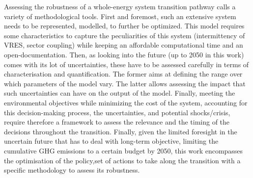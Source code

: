 
%
%
%

Assessing the robustness of a whole-energy system transition pathway calls a variety of methodological tools. First and foremost, such an extensive system needs to be represented, \ie modelled, to further be optimized. This model requires some characteristics to capture the peculiarities of this system (\eg intermittency of \gls{VRES}, sector coupling) while keeping an affordable computational time and an open-documentation.  Then, as looking into the future (\ie up to 2050 in this work) comes with its lot of uncertainties, these have to be assessed carefully in terms of characterisation and quantification. The former aims at defining the range over which parameters of the model vary. The latter allows assessing the impact that such uncertainties can have on the output of the model. Finally, meeting the environmental objectives while minimizing the cost of the system, accounting for this decision-making process, the uncertainties, and potential shocks/crisis, require therefore a framework to assess the relevance and the timing of the decisions throughout the transition. Finally, given the limited foresight in the uncertain future that has to deal with long-term objective, \ie limiting the cumulative \gls{GHG} emissions to a certain budget by 2050, this work encompasses the optimisation of the policy,\ie set of actions to take along the transition with a specific methodology to assess its robustness. 

